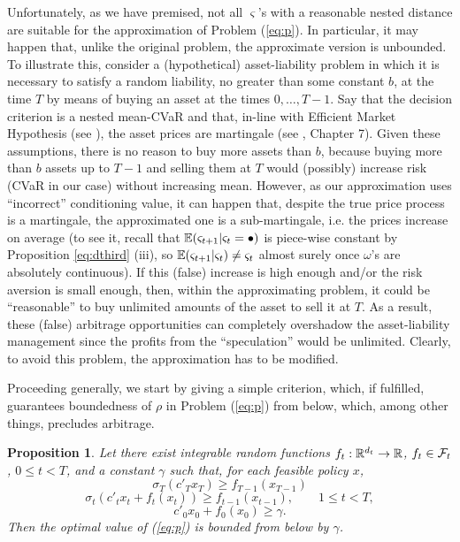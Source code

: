 \documentclass{article}              %
\newtheorem{proposition}{Proposition}
\begin{document}
Unfortunately, as we have premised, not all $\varsigma$'s with a reasonable nested distance
are suitable for the approximation of Problem (\ref{eq:p}). In particular,
it may happen that, unlike the original problem, the approximate
version is unbounded. To illustrate this, consider a (hypothetical)
asset-liability problem in which it is necessary to satisfy a random 
liability, no greater than some constant $b$, at the time $T$ by means of buying an asset at the times
$0,\dots,T-1$. Say that the decision criterion is a nested mean-CVaR and that, in-line with Efficient Market Hypothesis (see \cite{Cuthbertson97}), the asset prices are martingale (see \cite{Kallenberg02}, Chapter 7). Given these assumptions, there is no reason to buy more assets than $b$, because buying more than $b$ assets up to $T-1$ and selling them at $T$ would (possibly) increase
risk (CVaR in our case) without increasing mean. However, as our approximation uses ``incorrect'' conditioning value, it can happen that, despite the true price process is a martingale, the approximated one is a sub-martingale, i.e. the prices increase on average (to see it, recall that $\mathbb{E}(\varsigma_{t+1}|\varsigma_t=\bullet)$
is piece-wise constant by Proposition \ref{eq:dthird} (iii), so $\mathbb{E}(\varsigma_{t+1}|\varsigma_{t})\neq\varsigma_{t}$
almost surely once $\omega$'s are absolutely continuous). If this (false) increase is high enough and/or the risk aversion is small enough, then, within the approximating problem, it could be ``reasonable'' to buy unlimited amounts of the asset to sell it at $T$. As a result, these (false) arbitrage opportunities can completely overshadow the asset-liability
management since the profits from the ``speculation'' would be unlimited. Clearly, to avoid this problem, the approximation has to be modified.

Proceeding generally, we start by giving a simple criterion, which,
if fulfilled, guarantees boundedness of $\rho$ in Problem (\ref{eq:p})
from below, which, among other things, precludes arbitrage.

\begin{proposition}
\label{cor:feas} Let there exist integrable random functions $f_{t}:\mathbb{R}^{d_{t}}\rightarrow\mathbb{R}$, $f_t \in \mathcal{F}_t$,
$0\leq t<T$, and a constant $\gamma$ such that, for each feasible
policy $x$, 
\begin{equation}\label{eq:f1}
\sigma_T(c'{}_{T}x_{T})\geq f_{T-1}(x_{T-1})
\end{equation}
\begin{equation}\label{eq:f2}
\sigma_t(c'{}_{t}x_{t}+f_{t}(x_{t}))\geq f_{t-1}(x_{t-1}),\qquad1\leq t< T,
\end{equation}
\begin{equation}\label{eq:f3}
c'_{0}x_{0}+f_{0}(x_{0})\geq\gamma.
\end{equation}
Then the optimal value of (\ref{eq:p}) is bounded from below by $\gamma$.

\end{proposition}
\end{document}
